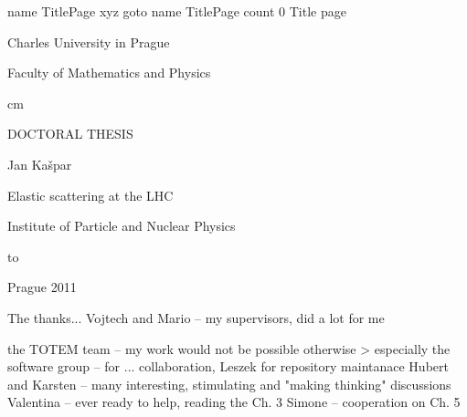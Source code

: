 







\let\BiggerFonts\SetFontSizesXII
\let\NormalFonts\SetFontSizesX
\let\SmallerFonts\SetFontSizesVIII

\NormalFonts

\ParIndent=5mm

\Reftrue
\Toctrue

\iftrue
	\ShowLabelstrue \advance\hoffset-1.5cm
\else
	\def\FootText{(VERSION 13)}
\fi

\def\pmt#1{{\tt #1}}




\pdfdest name {TitlePage} xyz
\pdfoutline goto name {TitlePage} count 0 {Title page}%


\centerline{\fPbxiv Charles University in Prague}
\centerline{\fPbxiv Faculty of Mathematics and Physics}
	cm
\centerline{\fPbxx DOCTORAL THESIS}
\vskip1cm
\centerline{}
\vskip3cm
\centerline{\fPbxiv Jan Ka\v spar}
\vskip1cm
\centerline{\fPbxx Elastic scattering at the LHC}
\centerline{\fPbxx\FootText}
\vskip2cm
\centerline{\fPbxiv Institute of Particle and Nuclear Physics}
\ialign to
\vskip2cm
\centerline{\fPbxiv Prague 2011}


\vfil\eject


\bgroup

\egroup

\vfil

The thanks...
\iffalse
\> Vojtech and Mario -- my supervisors, did a lot for me

\> the TOTEM team -- my work would not be possible otherwise
\>> especially the software group -- for ... collaboration, Leszek for repository maintanace
\> Hubert and Karsten -- many interesting, stimulating and "making thinking" discussions
\> Valentina -- ever ready to help, reading the Ch. 3
\> Simone -- cooperation on Ch. 5

